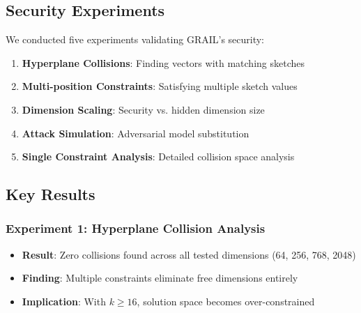 \documentclass[11pt,a4paper]{article}
\begin{document}
\subsection{Security Experiments}

We conducted five experiments validating GRAIL's security:

\begin{enumerate}
    \item \textbf{Hyperplane Collisions}: Finding vectors with matching sketches
    \item \textbf{Multi-position Constraints}: Satisfying multiple sketch values
    \item \textbf{Dimension Scaling}: Security vs. hidden dimension size
    \item \textbf{Attack Simulation}: Adversarial model substitution
    \item \textbf{Single Constraint Analysis}: Detailed collision space analysis
\end{enumerate}

\subsection{Key Results}

\subsubsection{Experiment 1: Hyperplane Collision Analysis}
\begin{itemize}
    \item \textbf{Result}: Zero collisions found across all tested dimensions (64, 256, 768, 2048)
    \item \textbf{Finding}: Multiple constraints eliminate free dimensions entirely
    \item \textbf{Implication}: With $k \geq 16$, solution space becomes over-constrained
\end{itemize}
\end{document}
